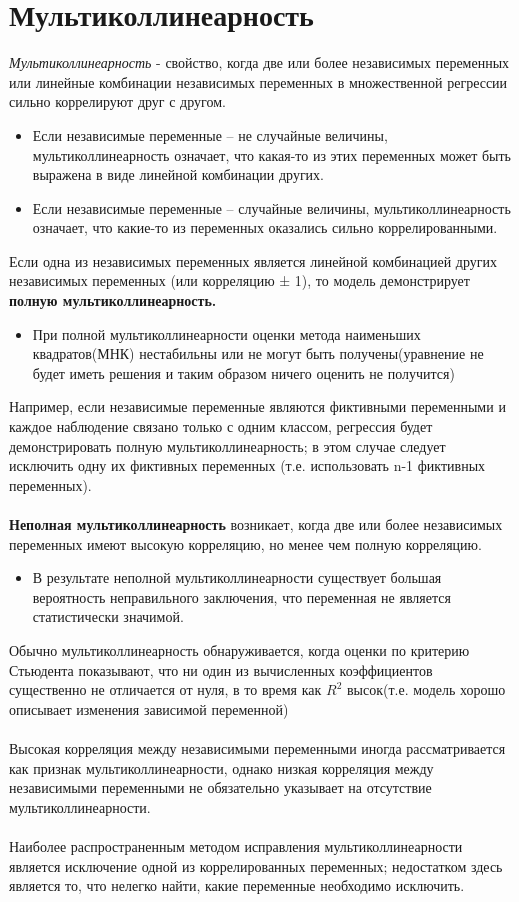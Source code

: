 \documentclass{article}
\begin{document}
	\section{Мультиколлинеарность}
	\textit{Мультиколлинеарность} - свойство, когда две или более независимых переменных или линейные комбинации независимых переменных в множественной регрессии сильно коррелируют друг с другом.
	\begin{itemize}
		\item Если независимые переменные – не случайные величины, мультиколлинеарность означает, что какая-то из этих переменных может быть выражена в виде линейной комбинации других.
		\item Если независимые переменные – случайные величины, мультиколлинеарность означает, что какие-то из переменных оказались сильно коррелированными. 
	\end{itemize}
	Если одна из независимых переменных является линейной комбинацией других независимых переменных (или корреляцию ± 1), то модель демонстрирует \textbf{ полную мультиколлинеарность.}
	\begin{itemize}
		\item При полной мультиколлинеарности оценки метода наименьших квадратов(МНК) нестабильны или не могут быть получены(уравнение не будет иметь решения и таким образом ничего оценить не получится)
	\end{itemize}
	Например, если независимые переменные являются фиктивными переменными и каждое наблюдение связано только с одним классом, регрессия будет демонстрировать полную мультиколлинеарность; в этом случае следует исключить одну их фиктивных переменных (т.е. использовать n-1 фиктивных переменных).\\
	\\
	\textbf{Неполная мультиколлинеарность} возникает, когда две или более независимых переменных имеют высокую корреляцию, но менее чем полную корреляцию.
	\begin{itemize}
		\item В результате неполной мультиколлинеарности существует большая вероятность неправильного заключения, что переменная не является статистически значимой.
	\end{itemize}
	Обычно мультиколлинеарность обнаруживается, когда оценки по критерию Стьюдента показывают, что ни один из вычисленных коэффициентов существенно не отличается от нуля, в то время как $R^{2}$ высок(т.е. модель хорошо описывает изменения зависимой переменной)\\
	\\
	Высокая корреляция между независимыми переменными иногда рассматривается как признак мультиколлинеарности, однако низкая корреляция между независимыми переменными не обязательно указывает на отсутствие мультиколлинеарности.\\
	\\
	Наиболее распространенным методом исправления мультиколлинеарности является исключение одной из коррелированных переменных; недостатком здесь является то, что нелегко найти, какие переменные необходимо исключить.
\end{document}
